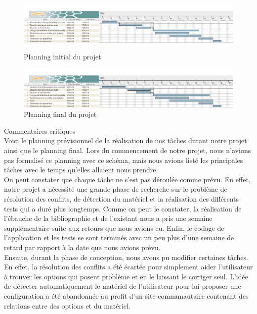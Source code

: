\documentclass[16pts]{report}
\begin{document}
	\begin{figure}
		\includegraphics[scale=0.5]{./illustrations/planning_initial_pdp.png}
		\centering
		\caption{Planning initial du projet}
		\label{fig:PlanningInitial}
		\vspace{10.00mm}
		\includegraphics[scale=0.5]{./illustrations/planning_final_pdp.png}
		\centering
		\caption{Planning final du projet}
		\label{fig:PlanningFinal}
	\end{figure}

\newpage
Commentaires critiques\\

    Voici le planning prévisionnel de la réalisation de nos tâches durant notre
    projet ainsi que le planning final. Lors du commencement de notre projet,
    nous n'avions pas formalisé ce planning avec ce schéma, mais nous avions
    listé les principales tâches avec le temps qu'elles allaient nous prendre.
    \\

    On peut constater que chaque tâche ne s'est pas déroulée comme prévu.  En
    effet, notre projet a nécessité une grande phase de recherche sur le
    problème de résolution des conflits, de détection du matériel et la
    réalisation des différents tests qui a duré plus longtemps.  Comme on peut
    le constater, la réalisation de l'ébauche de la bibliographie et de
    l'existant nous a pris une semaine supplémentaire suite aux retours que
    nous avions eu. Enfin, le codage de l'application et les tests se sont
    terminés avec un peu plus d'une semaine de retard par rapport à la date que
    nous avions prévu.  \\

    Ensuite, durant la phase de conception, nous avons pu modifier certaines
    tâches. En effet, la résolution des conflits a été écartée pour simplement
    aider l'utilisateur à trouver les options qui posent	problème et en le
    laissant le corriger seul. L'idée de détecter automatiquement le matériel
    de l'utilisateur pour lui proposer une configuration a été abandonnée au
    profit d'un site communautaire contenant des relations entre des options et
    du matériel.
\end{document}
